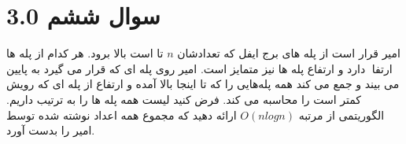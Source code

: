 \documentclass[12pt]{article}
\begin{document}
\section{سوال ششم 3.0}
امیر قرار است از پله های برج ایفل که تعدادشان $n$ تا است بالا برود. هر کدام از پلە ها ارتفاعͬ دارد و ارتفاع پلە ها نیز متمایز است. امیر روی پلە ای که قرار می گیرد به پایین می بیند و جمع می کند همه پلەهایی را که تا اینجا بالا آمده و ارتفاع از پلە ای که رویش کمتر است را محاسبه می کند. فرض کنید لیست همه پلە ها را به ترتیب داریم. الگوریتمی از مرتبه $O(nlogn)$ ارائه دهید که مجموع همه اعداد نوشته شده توسط امیر را بدست آورد.
\end{document}
